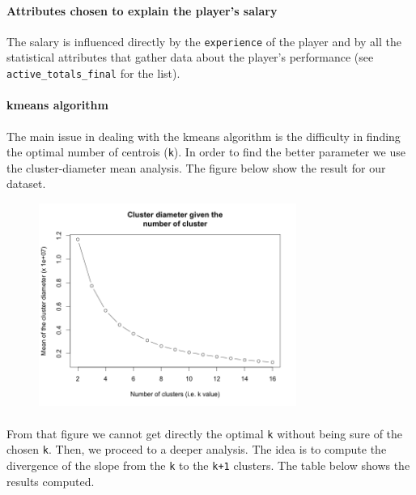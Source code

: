 \paragraph{Attributes chosen to explain the player's salary}The salary is influenced directly by the \texttt{experience} of the player and by all the statistical attributes that gather data about the player's performance (see \texttt{active\_totals\_final} for the list).

\paragraph{kmeans algorithm}The main issue in dealing with the kmeans algorithm is the difficulty in finding the optimal number of centrois (\texttt{k}). In order to find the better parameter we use the cluster-diameter mean analysis. The figure below show the result for our dataset. 

\begin{figure}[h!]
\centering
\includegraphics[width=0.75\textwidth]{images/diameter_kmeans}
\end{figure}

\paragraph{}From that figure we cannot get directly the optimal \texttt{k} without being sure of the chosen \texttt{k}. Then, we proceed to a deeper analysis. The idea is to compute the divergence of the slope from the \texttt{k} to the \texttt{k+1} clusters. The table below shows the results computed.\\

